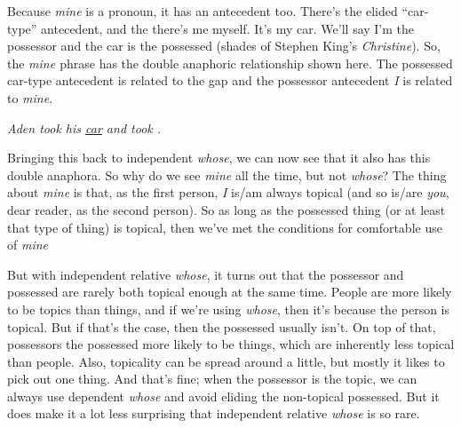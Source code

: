 \bigskip

Because \textit{mine} is a pronoun, it has an antecedent too. There's the elided ``car-type'' antecedent, and the there's me myself. It's my car. We'll say I'm the possessor and the car is the possessed (shades of Stephen King's \textit{Christine}). So, the \textit{mine \uline{\phantom{car}}} phrase has the double anaphoric relationship shown here. The possessed car-type antecedent is related to the gap and the possessor antecedent \textit{I} is related to \textit{mine}.

\bigskip

\ea \textit{Aden took his \uline{car} and  took  \uline{\phantom{car}}.}\\
    \label{ex:Aden3}
\z

Bringing this back to independent \textit{whose}, we can now see that it also has this double anaphora. So why do we see \textit{mine} all the time, but not \textit{whose}? The thing about \textit{mine} is that, as the first person, \textit{I} is/am always topical (and so is/are \textit{you}, dear reader, as the second person). So as long as the possessed thing (or at least that type of thing) is topical, then we've met the conditions for comfortable use of \textit{mine}

But with independent relative \textit{whose}, it turns out that the possessor and possessed are rarely both topical enough at the same time. People are more likely to be topics than things, and if we're using \textit{whose}, then it's because the person is topical. But if that's the case, then the possessed usually isn't. On top of that, possessors the possessed more likely to be things, which are inherently less topical than people. Also, topicality can be spread around a little, but mostly it likes to pick out one thing. And that's fine; when the possessor is the topic, we can always use dependent \textit{whose} and avoid eliding the non-topical possessed. But it does make it a lot less surprising that independent relative \textit{whose} is so rare.


